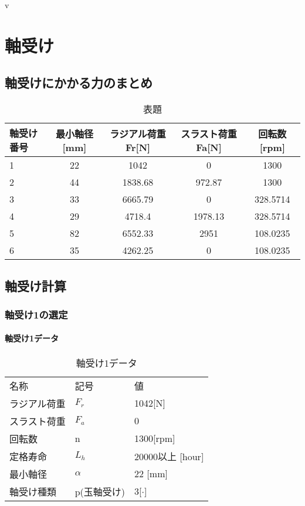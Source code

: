 v\chapter{軸受け}
\section{軸受けにかかる力のまとめ}
\begin{table}[htb]
\begin{center}
  \caption{表題}
  \begin{tabular}{|l||c|c|c|c|} \hline
軸受け番号& 最小軸径[mm] &ラジアル荷重Fr[N] &スラスト荷重Fa[N]&回転数[rpm]\\\hline
1 &22 &1042    &0       &1300\\
2 &44 &1838.68 &972.87  &1300\\
3 &33 &6665.79 &0       &328.5714\\
4 &29 &4718.4  &1978.13 &328.5714\\
5 &82 &6552.33 &2951    &108.0235\\
6 &35 &4262.25 &0       &108.0235\\
\hline
  \end{tabular}
\end{center}
\end{table}





\section{軸受け計算}
\newpage
\subsection{軸受け1の選定}
\subsubsection{軸受け1データ}
\begin{table}[htb]
\begin{center}
  \caption{軸受け1データ}
  \begin{tabular}{lll} \hline
名称&記号&値\\
ラジアル荷重&$F_r$&1042[N]\\
スラスト荷重&$F_a$&0\\
回転数&n&1300[rpm]\\
定格寿命&$L_h$&20000以上 [hour]\\
最小軸径&$\alpha$&22 [mm]\\
軸受け種類&p(玉軸受け)&3[$\cdot$]\\
\hline
  \end{tabular}
\end{center}
\end{table}

